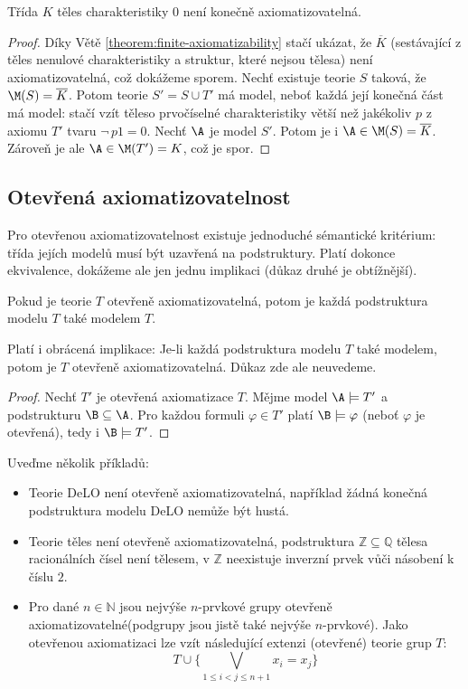 \begin{proposition}
Třída $K$ těles charakteristiky $0$ není konečně axiomatizovatelná.   
\end{proposition}
\begin{proof}
Díky Větě \ref{theorem:finite-axiomatizability} stačí ukázat, že $\overline{K}$ (sestávající z těles nenulové charakteristiky a struktur, které nejsou tělesa) není axiomatizovatelná, což dokážeme sporem. Nechť existuje teorie $S$ taková, že $\M(S)=\overline{K}$. Potom teorie 
$S'=S\cup T'$ má model, neboť každá její konečná část má model: stačí vzít těleso prvočíselné charakteristiky větší než jakékoliv $p$ z axiomu $T'$ tvaru $\neg\, p1=0$. Nechť $\A$ je model $S'$. Potom je i $\A\in\M(S)=\overline{K}$. Zároveň je ale $\A\in\M(T')=K$, což je spor.
\end{proof}

\subsection{Otevřená axiomatizovatelnost}

Pro otevřenou axiomatizovatelnost existuje jednoduché sémantické kritérium: třída jejích modelů musí být uzavřená na podstruktury. Platí dokonce ekvivalence, dokážeme ale jen jednu implikaci (důkaz druhé je obtížnější).

\begin{theorem}\label{theorem:open-axiomatizability}
Pokud je teorie $T$ otevřeně axiomatizovatelná, potom je každá podstruktura modelu $T$ také modelem $T$.   
\end{theorem}

\begin{remark}
    Platí i obrácená implikace: Je-li každá podstruktura modelu $T$ také modelem, potom je $T$ otevřeně axiomatizovatelná. Důkaz zde ale neuvedeme.
\end{remark}

\begin{proof}
Nechť $T'$ je otevřená axiomatizace $T$. Mějme model $\A\models T'$  a podstrukturu $\B\subseteq\A$. Pro každou formuli $\varphi\in T'$ platí $\B\models\varphi$ (neboť $\varphi$ je otevřená), tedy i $\B\models T'$.  
\end{proof}

\begin{example}
    Uveďme několik příkladů:
    \begin{itemize}
        \item Teorie DeLO není otevřeně axiomatizovatelná, například žádná konečná podstruktura modelu DeLO nemůže být hustá.
        \item Teorie těles není otevřeně axiomatizovatelná, podstruktura $\mathbb Z\subseteq\mathbb Q$ tělesa racionálních čísel není tělesem, v $\mathbb Z$ neexistuje inverzní prvek vůči násobení k číslu $2$.
        \item Pro dané $n\in\mathbb N$ jsou nejvýše $n$-prvkové grupy otevřeně axiomatizovatelné(podgrupy jsou jistě také nejvýše $n$-prvkové). Jako otevřenou axiomatizaci lze vzít následující extenzi (otevřené) teorie grup $T$:
        $$
        T\cup \{\bigvee_{1\leq i<j\leq n+1}x_i=x_j\}
        $$
    \end{itemize}
\end{example}
